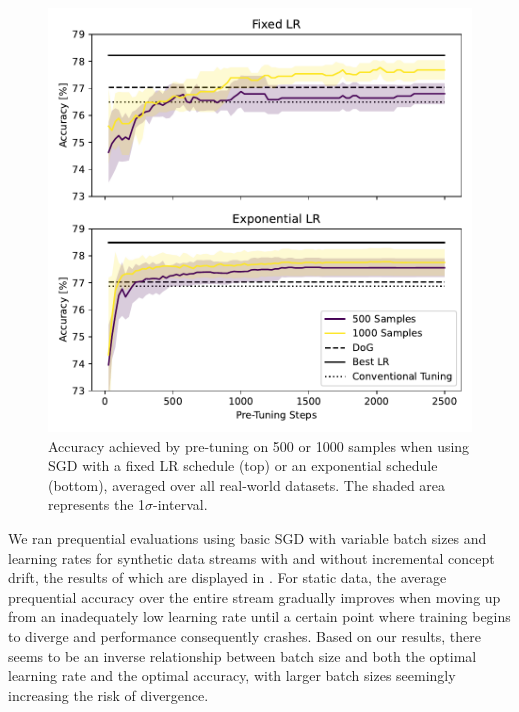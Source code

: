 \documentclass[letterpaper]{article} %
\begin{document}
\begin{figure}
	\centering
	\includegraphics[width=.47\textwidth]{figures/pretune_1x64_fixed_vs_exp_schedule.pdf}
	\caption{Accuracy achieved by pre-tuning on 500 or 1000 samples when using SGD with a fixed LR schedule (top) or an exponential schedule (bottom), averaged over all real-world datasets. The shaded area represents the 1$\sigma$-interval.}\label{fig:pretune_fixed_vs_exp_lr}
\end{figure}



We ran prequential evaluations using basic SGD with variable batch sizes and learning rates for synthetic data streams with and without incremental concept drift, the results of which are displayed in . For static data, the average prequential accuracy over the entire stream gradually improves when moving up from an inadequately low learning rate until a certain point where training begins to diverge and performance consequently crashes. Based on our results, there seems to be an inverse relationship between batch size and both the optimal learning rate and the optimal accuracy, with larger batch sizes seemingly increasing the risk of divergence.
\end{document}
